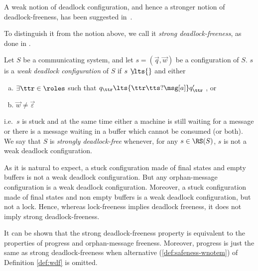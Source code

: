   
  A weak notion of deadlock configuration, and hence a stronger notion of deadlock-freeness, has been suggested in~\cite{TG18}. 

To distinguish it from the notion above, we call it \emph{strong deadlock-freeness}, as done in \cite{BdLH19}.

  \begin{definition}\label{def:strong-df}%
\label{def:wdf}
Let $S$ be a communicating system, and let $s= (\vec{q},\vec{w})$ be a configuration of $S$.
$s$ is a {\em weak deadlock configuration} of $S$ if $s\, \not\!\!\lts{}$ and either
\begin{enumerate}[a)]
\item $\exists \ttr\in\roles$ such that $q_\ttr \lts{\ttr\tts?\msg[a]} q'_\ttr$ , or
\item
\label{def:safeness-wnotem}
$\vec{w}\neq\vec{\varepsilon}$ 
\end{enumerate}
i.e.\ $s$ is stuck and at the same time either a machine is still waiting for a message
or there is a message waiting in a buffer which cannot be consumed (or both).
We say that $S$ is {\em strongly deadlock-free} whenever, for any $s\in \RS(S)$, $s$ is not a weak deadlock configuration.
\end{definition}

As it is natural to expect, a stuck configuration made of final states and empty buffers is not a weak deadlock configuration.
But any orphan-message configuration is a weak deadlock configuration.
Moreover, a stuck configuration made of final states and non empty buffers is a weak
deadlock configuration, but not a lock. Hence, whereas lock-freeness implies deadlock freeness, it does   not imply strong deadlock-freeness.


It can be shown that the strong deadlock-freeness property is equivalent to the properties of progress and orphan-message freeness. Moreover,
progress is just the same as  strong deadlock-freeness when alternative (\ref{def:safeness-wnotem}) of Definition
\ref{def:wdf}
is omitted.


